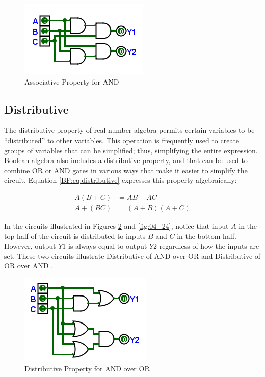 \begin{figure}[H]
	\centering
	\includegraphics[width=\maxwidth{.95\linewidth}]{gfx/04_22}
	\caption{Associative Property for AND}
	\label{fig:04_22}
\end{figure}

\subsection{Distributive}
\label{BF:subsec:distributive_property}

The distributive property of real number algebra permits certain variables to be ``distributed'' to other variables. This operation is frequently used to create groups of variables that can be simplified; thus, simplifying the entire expression. Boolean algebra also includes a distributive property, and that can be used to combine \textsf{OR}  or \textsf{AND}  gates in various ways that make it easier to simplify the circuit. Equation \ref{BF:eq:distributive} expresses this property algebraically:

\begin{align}
  \label{BF:eq:distributive}
  A( B + C ) &= AB + AC \\
  \nonumber
  A + (BC) &= (A + B) (A + C)
\end{align}

In the circuits illustrated in Figures \ref{fig:04_23} and \ref{fig:04_24}, notice that input $ A $ in the top half of the circuit is distributed to inputs $ B $ and $ C $ in the bottom half. However, output $ Y1 $ is always equal to output $ Y2 $ regardless of how the inputs are set. These two circuits illustrate Distributive of \textsf{AND} over \textsf{OR}  and Distributive of \textsf{OR} over \textsf{AND} .
 
\begin{figure}[H]
	\centering
	\includegraphics[width=\maxwidth{.95\linewidth}]{gfx/04_23}
	\caption{Distributive Property for AND over OR}
	\label{fig:04_23}
\end{figure}

